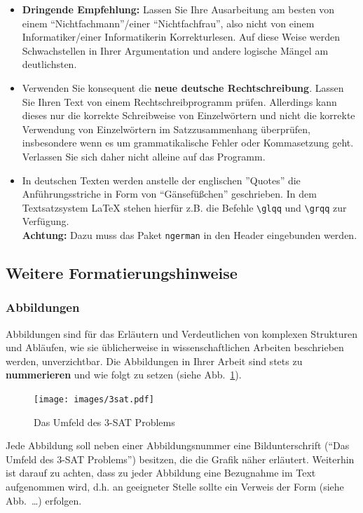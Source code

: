 \begin{itemize}
\item {\bf Dringende Empfehlung:} Lassen Sie Ihre Ausarbeitung am besten von einem "`Nichtfachmann"'/einer "`Nichtfachfrau"', also nicht von einem Informatiker/einer Informatikerin Korrekturlesen.
Auf diese Weise werden Schwachstellen in Ihrer Argumentation und andere logische Mängel am deutlichsten.
\item Verwenden Sie konsequent die {\bf neue deutsche Rechtschreibung}.
Lassen Sie Ihren Text von einem Rechtschreibprogramm prüfen.
Allerdings kann dieses nur die korrekte Schreibweise von Einzelwörtern und nicht die korrekte Verwendung von Einzelwörtern im Satzzusammenhang überprüfen, insbesondere wenn es um grammatikalische Fehler oder Kommasetzung geht.
Verlassen Sie sich daher nicht alleine auf das Programm.
\item In deutschen Texten werden anstelle der englischen ''Quotes'' die Anführungsstriche in Form von "`Gänsefüßchen"' geschrieben.
In dem Textsatzsystem {\LaTeX} stehen hierfür z.B. die Befehle \verb|\glqq| und \verb|\grqq| zur Verfügung. \\
{\bf Achtung:} Dazu muss das Paket {\tt ngerman} in den Header eingebunden werden.
\end{itemize}



\subsection{Weitere Formatierungshinweise}
\subsubsection{Abbildungen}
Abbildungen sind für das Erläutern und Verdeutlichen von komplexen Strukturen und Abläufen, wie sie üblicherweise in wissenschaftlichen Arbeiten beschrieben werden, unverzichtbar.
Die Abbildungen in Ihrer Arbeit sind stets zu {\bf nummerieren} und wie folgt zu setzen (siehe Abb.~\ref{fig_Abb1}).
\begin{figure}[ht]
  \begin{center}
  \texttt{[image: images/3sat.pdf]}
  \end{center}
  \caption{Das Umfeld des 3-SAT Problems}
  \label{fig_Abb1}
\end{figure}

Jede Abbildung soll neben einer Abbildungsnummer eine Bildunterschrift ("`Das Umfeld des 3-SAT Problems"') besitzen, die die Grafik näher erläutert.
Weiterhin ist darauf zu achten, dass zu jeder Abbildung eine Bezugnahme im Text aufgenommen wird, d.h. an geeigneter Stelle sollte ein Verweis der Form (siehe Abb.~\dots) erfolgen.

